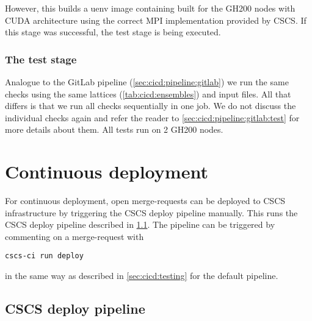 However, this builds a uenv image containing \quda built for the GH200 nodes with CUDA architecture  using the correct MPI implementation provided by CSCS.
If this stage was successful, the test stage is being executed.

\subsubsection{The test stage}

Analogue to the GitLab pipeline (\cref{sec:cicd:pipeline:gitlab}) we run the same checks using the same lattices (\cref{tab:cicd:ensembles}) and input files.
All that differs is that we run all checks sequentially in one job.
We do not discuss the individual checks again and refer the reader to \cref{sec:cicd:pipeline:gitlab:test} for more details about them.
All tests run on \num{2} GH200 nodes.

\section{Continuous deployment}
\label{sec:cicd:deployment}

For continuous deployment, open merge-requests can be deployed to CSCS infrastructure by triggering the CSCS deploy pipeline manually.
This runs the CSCS deploy pipeline described in \cref{sec:cd:pipeline:cscs}.
The pipeline can be triggered by commenting on a merge-request with
\begin{verbatim}
cscs-ci run deploy
\end{verbatim}
in the same way as described in \cref{sec:cicd:testing} for the default pipeline.

\subsection{CSCS deploy pipeline}
\label{sec:cd:pipeline:cscs}

